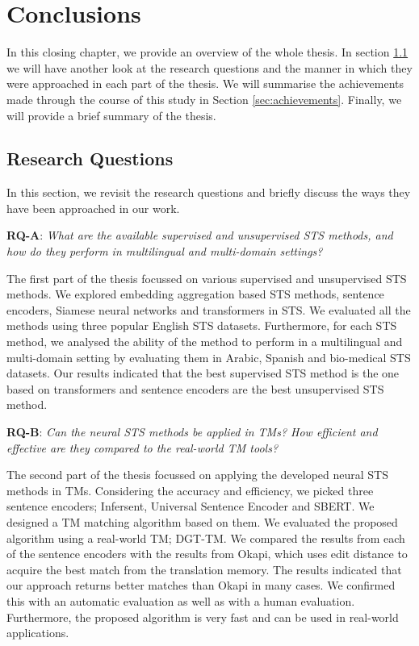 \chapter{Conclusions}
\label{cha:conclusions}

In this closing chapter, we provide an overview of the whole thesis. In section \ref{sec:rq} we will have another look at the research questions and the manner in which they were approached in each part of the thesis. We will summarise the achievements made through the course of this study in Section \ref{sec:achievements}. Finally, we will provide a brief summary of the thesis.

\section{Research Questions}
\label{sec:rq}
In this section, we revisit the research questions and briefly discuss the ways they have been approached in our work.

\textbf{RQ-A}: \textit{What are the available supervised and unsupervised STS methods, and how do they perform in multilingual and multi-domain settings?}

The first part of the thesis focussed on various supervised and unsupervised STS methods. We explored embedding aggregation based STS methods, sentence encoders, Siamese neural networks and transformers in STS. We evaluated all the methods using three popular English STS datasets. Furthermore, for each STS method, we analysed the ability of the method to perform in a multilingual and multi-domain setting by evaluating them in Arabic, Spanish and bio-medical STS datasets. Our results indicated that the best supervised STS method is the one based on transformers and sentence encoders are the best unsupervised STS method. 

\textbf{RQ-B}: \textit{Can the neural STS methods be applied in TMs? How efficient and effective are they compared to the real-world TM tools?}

The second part of the thesis focussed on applying the developed neural STS methods in TMs. Considering the accuracy and efficiency, we picked three sentence encoders; Infersent, Universal Sentence Encoder and SBERT. We designed a TM matching algorithm based on them. We evaluated the proposed algorithm using a real-world TM; DGT-TM. We compared the results from each of the sentence encoders with the results from Okapi, which uses edit distance to acquire the best match from the translation memory. The results indicated that our approach returns better matches than Okapi in many cases. We confirmed this with an automatic evaluation as well as with a human evaluation. Furthermore, the proposed algorithm is very fast and can be used in real-world applications.

